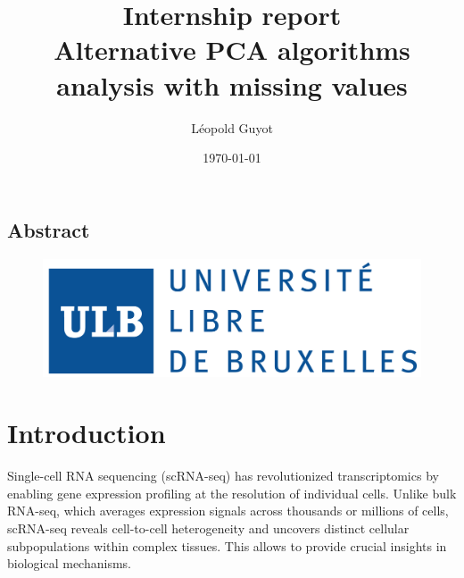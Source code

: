 \documentclass[a4paper, 11pt, twocolumn]{article}
\title{\Large Internship report \\
\huge Alternative PCA algorithms analysis with missing values}
\author{Léopold Guyot}
\date{\today}
\begin{document}
\pagestyle{fancy}
\setlength{\headheight}{25.0117pt}
\fancyhead{}\fancyfoot{}
\fancyfoot[R]{\thepage}

\onecolumn
\maketitle

\begin{tcolorbox}[breakable,colback=white,colframe=black,width=\dimexpr\textwidth+12mm\relax,enlarge left by=-6mm]

\section*{Abstract}


\end{tcolorbox}

\begin{figure}[H]
          \begin{minipage}{\textwidth}
                \centering
                \includegraphics[width = .8\linewidth]{img/LOGO_Universite__libre_bruxelles.png}
          \end{minipage}
\end{figure}


\twocolumn
\section{Introduction}

Single-cell RNA sequencing (scRNA-seq) has revolutionized transcriptomics by enabling gene expression profiling at the resolution of individual cells. Unlike bulk RNA-seq, which averages expression signals across thousands or millions of cells, scRNA-seq reveals cell-to-cell heterogeneity and uncovers distinct cellular subpopulations within complex tissues. This allows to provide crucial insights in biological mechanisms.
\end{document}
